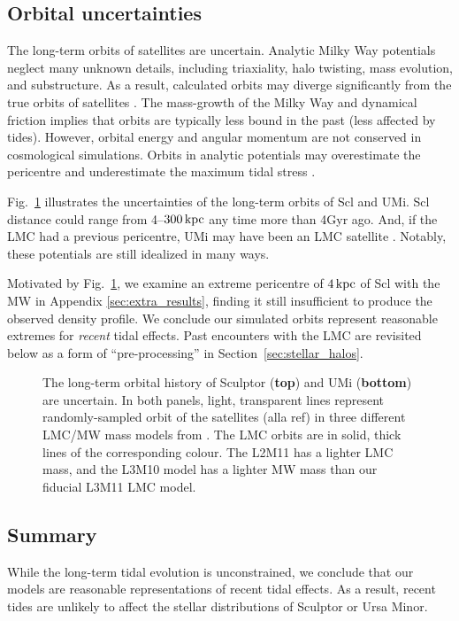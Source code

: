 \subsection{Orbital uncertainties}\label{orbital-uncertainties}

The long-term orbits of satellites are uncertain. Analytic Milky Way
potentials neglect many unknown details, including triaxiality, halo
twisting, mass evolution, and substructure. As a result, calculated
orbits may diverge significantly from the true orbits of satellites
\citep[e.g.,][]{dsouza+bell2022}. The mass-growth of the Milky Way and
dynamical friction implies that orbits are typically less bound in the
past (less affected by tides). However, orbital energy and angular
momentum are not conserved in cosmological simulations. Orbits in
analytic potentials may overestimate the pericentre and underestimate
the maximum tidal stress \citep[although typically not by enough to
change our conclusions,][]{santistevan+2023, santistevan+2024}.

Fig.~\ref{fig:scl_orbit_lmc_uncert} illustrates the uncertainties of the
long-term orbits of Scl and UMi. Scl distance could range from
4--\(300\,{\rm kpc}\) any time more than 4Gyr ago. And, if the LMC had a
previous pericentre, UMi may have been an LMC satellite
\citep[see][]{vasiliev2024}. Notably, these potentials are still
idealized in many ways.

Motivated by Fig.~\ref{fig:scl_orbit_lmc_uncert}, we examine an extreme
pericentre of \(4\,{\rm kpc}\) of Scl with the MW in Appendix
\ref{sec:extra_results}, finding it still insufficient to produce the
observed density profile. We conclude our simulated orbits represent
reasonable extremes for \emph{recent} tidal effects. Past encounters
with the LMC are revisited below as a form of ``pre-processing'' in
Section~\ref{sec:stellar_halos}.

\begin{figure}
\centering
{}
\caption[Sculptor Orbits with LMC]{The long-term orbital history of
Sculptor (\textbf{top}) and UMi (\textbf{bottom}) are uncertain. In both
panels, light, transparent lines represent randomly-sampled orbit of the
satellites (alla ref) in three different LMC/MW mass models from
\citet{vasiliev2024}. The LMC orbits are in solid, thick lines of the
corresponding colour. The L2M11 has a lighter LMC mass, and the L3M10
model has a lighter MW mass than our fiducial L3M11 LMC
model.}\label{fig:scl_orbit_lmc_uncert}
\end{figure}

\subsection{Summary}\label{summary-2}

While the long-term tidal evolution is unconstrained, we conclude that
our models are reasonable representations of recent tidal effects. As a
result, recent tides are unlikely to affect the stellar distributions of
Sculptor or Ursa Minor.
